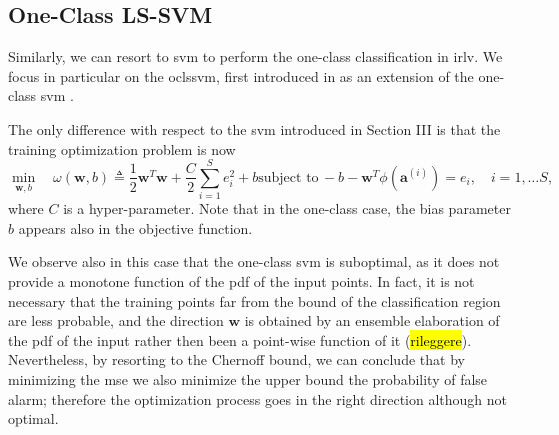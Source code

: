 \documentclass[draftcls,onecolumn,12pt]{IEEEtran}
\begin{document}
\subsection{One-Class LS-SVM}

Similarly, we can resort to \ac{svm} to perform the one-class classification in \ac{irlv}. We focus in particular on the  \ac{oclssvm}, first introduced in \cite{choi2009} as an extension of the one-class \ac{svm} \cite{Scholkopf2001estimating}. 

The only difference with respect to the \ac{svm} introduced in Section III is that the training optimization problem is now
\begin{subequations}
	\label{eq:oneClassSvm}
	\begin{equation}
	\label{eq:oneClass1}
	\underset{\bm{w},b}{\min} \quad \omega(\bm{w}, b) \triangleq
	 \frac{1}{2} \bm{w}^T \bm{w} +  \frac{C}{2} \sum_{i=1}^S e_i^2 +b
	\end{equation}
	\begin{equation}
	\label{eq:oneClassConstr}
	\text{subject to}\, -b - \bm{w}^T \phi (\bm{a}^{(i)})  = e_i,  \quad i = 1,\dots S, 
	\end{equation}
\end{subequations}
where $C$ is a hyper-parameter.
Note that in the one-class case, the bias parameter $b$ appears also in the objective function.


We observe also in this case that the one-class \ac{svm} is suboptimal, as it does not provide a monotone function of the \ac{pdf} of the input points. In fact, it is not necessary that the training points far from the bound of the classification region are less probable, and the direction $\bm{w}$ is obtained by an ensemble elaboration of the \ac{pdf} of the input rather then been a point-wise function of it (\hl{rileggere}). Nevertheless, by resorting to the Chernoff bound, we can conclude that by minimizing the \ac{mse} we also minimize the upper bound the probability of false alarm; therefore the optimization process goes in the right direction although not optimal.
\end{document}
